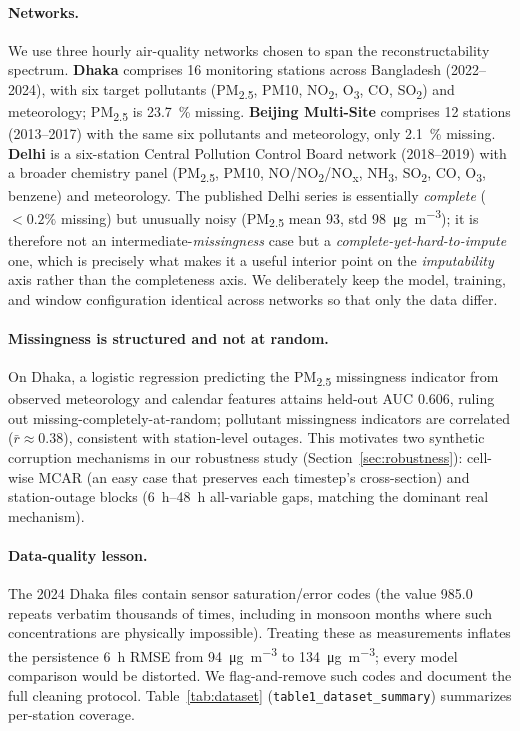 \documentclass[review,3p,times]{elsarticle}
\newcommand{\ugm}{\si{\micro\gram\per\cubic\metre}}
\newcommand{\pmf}{PM\textsubscript{2.5}}
\begin{document}
\paragraph{Networks.}
We use three hourly air-quality networks chosen to span the reconstructability
spectrum. \textbf{Dhaka} comprises 16 monitoring stations across Bangladesh
(2022--2024), with six target pollutants (\pmf, PM10,
NO\textsubscript{2}, O\textsubscript{3}, CO, SO\textsubscript{2}) and
meteorology; \pmf{} is \SI{23.7}{\percent} missing. \textbf{Beijing Multi-Site}
\citep{zhang2017cautionary} comprises 12 stations (2013--2017) with the same six
pollutants and meteorology, only \SI{2.1}{\percent} missing. \textbf{Delhi}
\citep{cpcb_delhi} is a six-station Central Pollution Control Board network
(2018--2019) with a broader chemistry panel
(\pmf, PM10, NO/NO\textsubscript{2}/NO\textsubscript{x}, NH\textsubscript{3},
SO\textsubscript{2}, CO, O\textsubscript{3}, benzene) and meteorology. The
published Delhi series is essentially \emph{complete} ($<\!0.2\%$ missing) but
unusually noisy (\pmf{} mean \num{93}, std \SI{98}{\ugm}); it is therefore not
an intermediate-\emph{missingness} case but a \emph{complete-yet-hard-to-impute}
one, which is precisely what makes it a useful interior point on the
\emph{imputability} axis rather than the completeness axis. We deliberately keep
the model, training, and window configuration identical across networks so that
only the data differ.

\paragraph{Missingness is structured and not at random.}
On Dhaka, a logistic regression predicting the \pmf{} missingness indicator from
observed meteorology and calendar features attains held-out AUC $0.606$, ruling
out missing-completely-at-random; pollutant missingness indicators are correlated
($\bar{r}\approx0.38$), consistent with station-level outages. This motivates two
synthetic corruption mechanisms in our robustness study
(Section~\ref{sec:robustness}): cell-wise MCAR (an easy case that preserves each
timestep's cross-section) and station-outage blocks (\SIrange{6}{48}{\hour}
all-variable gaps, matching the dominant real mechanism).

\paragraph{Data-quality lesson.}
The 2024 Dhaka files contain sensor saturation/error codes (the value
\num{985.0} repeats verbatim thousands of times, including in monsoon months
where such concentrations are physically impossible). Treating these as
measurements inflates the persistence \SI{6}{\hour} RMSE from \SI{94}{\ugm} to
\SI{134}{\ugm}; every model comparison would be distorted. We flag-and-remove
such codes and document the full cleaning protocol. Table~\ref{tab:dataset}
(\texttt{table1\_dataset\_summary}) summarizes per-station coverage.
\end{document}
